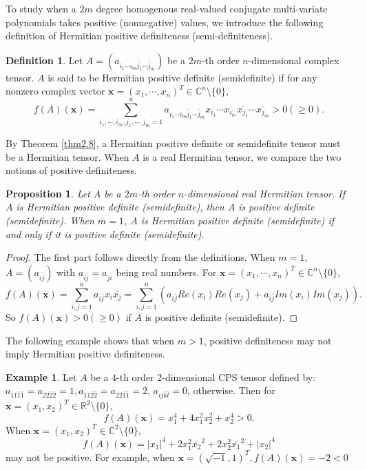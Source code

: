 \documentclass[10pt,reqno]{amsart}
\newtheorem{prop}[thm]{Proposition}
\theoremstyle{definition}
\newtheorem{defn}[thm]{Definition}
\newtheorem{exam}[thm]{Example}
\begin{document}
To study when a $2m$ degree homogenous real-valued conjugate multi-variate polynomials takes positive (nonnegative) values, we introduce the following definition of Hermitian positive definiteness (semi-definiteness).
\begin{defn} \label{complex}
Let $A=(a_{i_1\cdots i_m\bar{j}_1\cdots \bar{j}_m})$ be a $2m$-th order $n$-dimensional complex tensor. $A$ is said to be Hermitian positive definite (semidefinite) if for any nonzero complex vector $\mathbf{x}=(x_1,\cdots, x_n)^T\in \mathbb C^n\setminus \{0\}$, $$f(A)(\mathbf{x})=\sum_{i_1,\cdots, i_m, j_1, \cdots, j_m=1}^n a_{i_1\cdots i_m\bar{j}_1\cdots \bar{j}_m} x_{i_1}\cdots x_{i_m}\overline{x_{j_1}}\cdots\overline{x_{j_m}}>0 (\geq 0).$$
\end{defn}
By Theorem \ref{thm2.8}, a Hermitian positive definite or semidefinite tensor must be a Hermitian tensor. When $A$ is a real Hermitian tensor, we compare the two notions of positive definiteness.
\begin{prop} \label{diff}
Let $A$ be a $2m$-th order $n$-dimensional real Hermitian tensor. If $A$ is Hermitian positive definite (semidefinite), then $A$ is positive definite (semidefinite). When $m=1$, $A$ is Hermitian positive definite (semidefinite) if and only if it is positive definite (semidefinite).
\end{prop}
\begin{proof}
The first part follows directly from the definitions. When $m=1$, $A=(a_{i\bar{j}})$ with $a_{i\bar{j}}=a_{j\bar{i}}$ being real numbers. For $\mathbf{x}=(x_1,\cdots, x_n)^T\in \mathbb C^n\setminus \{0\}$, 
$$f(A)(\mathbf{x})=\sum_{i,j=1}^n a_{i\bar{j}}x_i\overline{x_{j}}=\sum_{i,j=1}^n (a_{i\bar{j}}Re(x_i)Re(x_{j})+a_{i\bar{j}}Im(x_i)Im(x_{j})).$$
So $f(A)(\mathbf{x})> 0(\geq 0)$ if $A$ is positive definite (semidefinite).
\end{proof}
The following example shows that when $m>1$, positive definiteness may not imply Hermitian positive definiteness.
\begin{exam}
Let $A$ be a $4$-th order 2-dimensional CPS tensor defined by: $a_{11\bar{1}\bar{1}}=a_{22\bar{2}\bar{2}}=1, a_{11\bar{2}\bar{2}}=a_{22\bar{1}\bar{1}}=2$, $a_{ij\bar{k}\bar{l}}=0$, otherwise. Then for $\mathbf{x}=(x_1,x_2)^T\in \mathbb R^2\setminus \{0\}$, $$f(A)(\mathbf{x})=x_1^4+4x_1^2x_2^2+x_2^4>0.$$ When $\mathbf{x}=(x_1,x_2)^T\in \mathbb C^2\setminus \{0\}$, $$f(A)(\mathbf{x})=|x_1|^4+2x_1^2\overline{x_2}^2+2x_2^2\overline{x_1}^2+|x_2|^4$$ may not be positive. For example, when $\mathbf{x}=(\sqrt{-1},1)^T, f(A)(\mathbf{x})=-2<0$
\end{exam}
\end{document}
